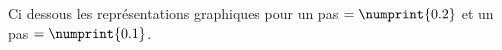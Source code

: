 \documentclass[main.tex]{subfiles}
\begin{document}
Ci dessous les représentations graphiques pour un pas $=\numprint{0.2}$ et un pas $=\numprint{0.1}$. \\
\noindent
%
%
%
\end{document}
